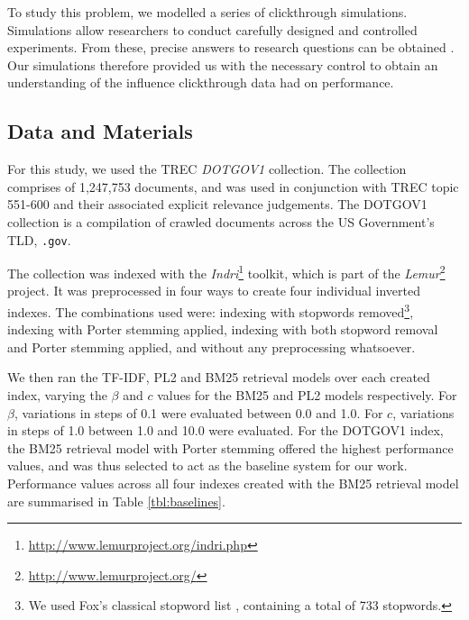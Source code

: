 To study this problem, we modelled a series of clickthrough simulations. Simulations allow researchers to conduct carefully designed and controlled experiments. From these, precise answers to research questions can be obtained \cite{azzopardi2011economics_of_iir, white05sim}. Our simulations therefore provided us with the necessary control to obtain an understanding of the influence clickthrough data had on performance.

\subsection{Data and Materials}\label{sec:method:materials}
For this study, we used the TREC \emph{DOTGOV1} collection. The collection comprises of 1,247,753 documents, and was used in conjunction with TREC topic 551-600 and their associated explicit relevance judgements. The DOTGOV1 collection is a compilation of crawled documents across the US Government's TLD, \texttt{.gov}.

The collection was indexed with the \emph{Indri}\footnote{\url{http://www.lemurproject.org/indri.php}} toolkit, which is part of the \emph{Lemur}\footnote{\url{http://www.lemurproject.org/}} project. It was preprocessed in four ways to create four individual inverted indexes. The combinations used were: indexing with stopwords removed\footnote{We used Fox's classical stopword list \cite{fox1992lexical_analysis}, containing a total of 733 stopwords.}, indexing with Porter stemming applied, indexing with both stopword removal and Porter stemming applied, and without any preprocessing whatsoever.

We then ran the TF-IDF, PL2 and BM25 retrieval models over each created index, varying the $\beta$ and $c$ values for the BM25 and PL2 models respectively. For $\beta$, variations in steps of 0.1 were evaluated between 0.0 and 1.0. For $c$, variations in steps of 1.0 between 1.0 and 10.0 were evaluated. For the DOTGOV1 index, the BM25 retrieval model with Porter stemming offered the highest performance values, and was thus selected to act as the baseline system for our work. Performance values across all four indexes created with the BM25 retrieval model are summarised in Table \ref{tbl:baselines}.

